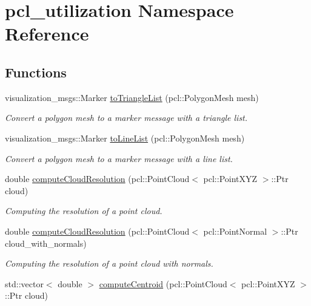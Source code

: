 \hypertarget{namespacepcl__utilization}{}\section{pcl\+\_\+utilization Namespace Reference}
\label{namespacepcl__utilization}
\subsection*{Functions}
\begin{DoxyCompactItemize}
\item 
visualization\+\_\+msgs\+::\+Marker \hyperlink{namespacepcl__utilization_a051f0954371074c7331ba054d185950f}{to\+Triangle\+List} (pcl\+::\+Polygon\+Mesh mesh)
\begin{DoxyCompactList}\small\item\em Convert a polygon mesh to a marker message with a triangle list. \end{DoxyCompactList}\item 
visualization\+\_\+msgs\+::\+Marker \hyperlink{namespacepcl__utilization_a1a3ffc60b638c2a551b02ba9a755d3f1}{to\+Line\+List} (pcl\+::\+Polygon\+Mesh mesh)
\begin{DoxyCompactList}\small\item\em Convert a polygon mesh to a marker message with a line list. \end{DoxyCompactList}\item 
double \hyperlink{namespacepcl__utilization_ac199fc2120c5dce78fd87c2c1e0445d0}{compute\+Cloud\+Resolution} (pcl\+::\+Point\+Cloud$<$ pcl\+::\+Point\+X\+YZ $>$\+::Ptr cloud)
\begin{DoxyCompactList}\small\item\em Computing the resolution of a point cloud. \end{DoxyCompactList}\item 
double \hyperlink{namespacepcl__utilization_a5fd7d53d77802f39bdec1098137e198a}{compute\+Cloud\+Resolution} (pcl\+::\+Point\+Cloud$<$ pcl\+::\+Point\+Normal $>$\+::Ptr cloud\+\_\+with\+\_\+normals)
\begin{DoxyCompactList}\small\item\em Computing the resolution of a point cloud with normals. \end{DoxyCompactList}\item 
std\+::vector$<$ double $>$ \hyperlink{namespacepcl__utilization_a217b6e0e27678d9f9bb1a7a4a39a20ea}{compute\+Centroid} (pcl\+::\+Point\+Cloud$<$ pcl\+::\+Point\+X\+YZ $>$\+::Ptr cloud)

\end{DoxyCompactItemize}
